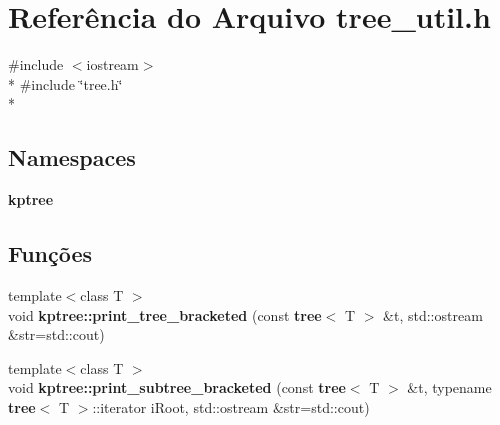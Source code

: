 \section{Referência do Arquivo tree\+\_\+util.\+h}
\label{tree__util_8h}
{\ttfamily \#include $<$iostream$>$}\\*
{\ttfamily \#include \char`\"{}tree.\+h\char`\"{}}\\*
\subsection*{Namespaces}
\begin{DoxyCompactItemize}
\item 
 {\bf kptree}
\end{DoxyCompactItemize}
\subsection*{Funções}
\begin{DoxyCompactItemize}
\item 
{\footnotesize template$<$class T $>$ }\\void {\bf kptree\+::print\+\_\+tree\+\_\+bracketed} (const {\bf tree}$<$ T $>$ \&t, std\+::ostream \&str=std\+::cout)
\item 
{\footnotesize template$<$class T $>$ }\\void {\bf kptree\+::print\+\_\+subtree\+\_\+bracketed} (const {\bf tree}$<$ T $>$ \&t, typename {\bf tree}$<$ T $>$\+::iterator i\+Root, std\+::ostream \&str=std\+::cout)
\end{DoxyCompactItemize}
